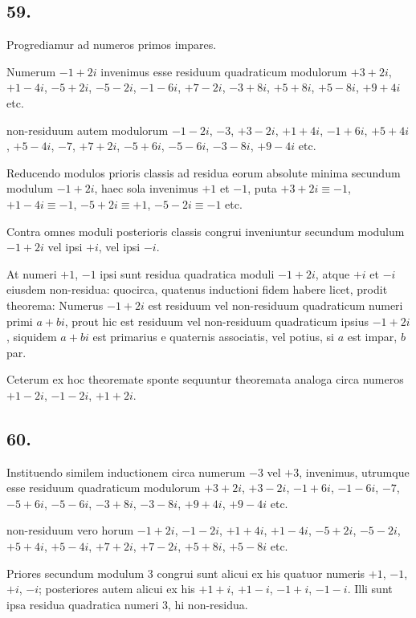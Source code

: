 \documentclass[twoside,12pt]{memoir}
\begin{document}
\subsection*{59.}
 
Progrediamur ad numeros primos impares.
 
Numerum \(-1+2 i\) invenimus esse residuum quadraticum modulorum \(+3+2 i\), \(+1-4 i\), \(-5+2 i\), \(-5-2 i\), \(-1-6 i\), \(+7-2 i\), \(-3+8 i\), \(+5+8 i\), \(+5-8 i\), \(+9+4 i\) etc.
 
non-residuum autem modulorum \(-1-2 i\), \(-3\), \(+3-2 i\), \(+1+4 i\), \(-1+6 i\), \(+5+4 i\), \(+5-4 i\), \(-7\), \(+7+2 i\), \(-5+6 i\), \(-5-6 i\), \(-3-8 i\), \(+9-4 i\) etc.
 
Reducendo modulos prioris classis ad residua eorum absolute minima secundum modulum \(-1+2 i\), haec sola invenimus \(+1\) et \(-1\), puta \(+3+2 i \equiv-1\), \(+1-4 i \equiv-1\), \(-5+2 i \equiv+1\), \(-5-2 i \equiv-1\) etc.
 
Contra omnes moduli posterioris classis congrui inveniuntur secundum modulum \(-1+2 i\) vel ipsi \(+i\), vel ipsi \(-i\).
 
At numeri \(+1\), \(-1\) ipsi sunt residua quadratica moduli \(-1+2 i\), atque \(+i\) et \(-i\) eiusdem non-residua: quocirca, quatenus inductioni fidem habere licet, prodit theorema: Numerus \(-1+2 i\) est residuum vel non-residuum quadraticum numeri primi \(a+b i\), prout hic est residuum vel non-residuum quadraticum ipsius \(-1+2 i\), siquidem \(a+b i\) est primarius e quaternis associatis, vel potius, si \(a\) est impar, \(b\) par.
 
Ceterum ex hoc theoremate sponte sequuntur theoremata analoga circa numeros \(+1-2 i\), \(-1-2 i\), \(+1+2 i\).

\subsection*{60.}
 
Instituendo similem inductionem circa numerum \(-3\) vel \(+3\), invenimus, utrumque esse residuum quadraticum modulorum \(+3+2 i\), \(+3-2 i\),\pagebreak%
\(-1+6 i\), \(-1-6 i\), \(-7\), \(-5+6 i\), \(-5-6 i\), \(-3+8 i\), \(-3-8 i\), \(+9+4 i\), \(+9-4 i\) etc.
 
non-residuum vero horum \(-1+2 i\), \(-1-2 i\), \(+1+4 i\), \(+1-4 i\), \(-5+2 i\), \(-5-2 i\), \(+5+4 i\), \(+5-4 i\), \(+7+2 i\), \(+7-2 i\), \(+5+8 i\), \(+5-8 i\) etc.
 
Priores secundum modulum 3 congrui sunt alicui ex his quatuor numeris \(+1\), \(-1\), \(+i\), \(-i\); posteriores autem alicui ex his \(+1+i\), \(+1-i\), \(-1+i\), \(-1-i\). Illi sunt ipsa residua quadratica numeri 3, hi non-residua.
 
\end{document}
